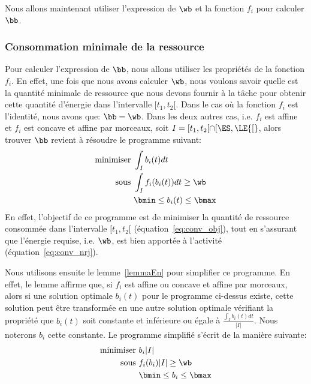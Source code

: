 Nous allons maintenant utiliser l'expression de $\wb$ et la fonction
$f_i$ pour calculer $\bb$.

\subsubsection{Consommation minimale de la ressource}

Pour calculer l'expression de $\bb$, nous allons utiliser les
propriétés de la fonction $f_i$. En effet, une fois que nous avons
calculer $\wb$, nous voulons savoir quelle est la quantité minimale de
ressource que nous devons fournir à la tâche pour obtenir cette
quantité d'énergie dans l'intervalle ${[}t_1,t_2{[}$. Dans le cas où
la fonction $f_i$ est l'identité, nous avons que: $\bb=\wb$. Dans les
deux autres cas, i.e. $f_i$ est affine et $f_i$ est concave et affine
par morceaux, soit $I=[t_1,t_2[ \cap [\ES,\LE{[}$, alors trouver $\bb$
revient à résoudre le programme suivant:
\begin{align}
  \text{minimiser }   & \int_{I} b_i(t)dt \label{eq:conv_obj} \\
  \text{sous } & \int_{I} f_i(b_i(t))dt \ge \wb \label{eq:conv_nrj}\\
                      & \bmin \le b_i(t) \le \bmax \label{eq:conv_min}
\end{align}
En effet, l'objectif de ce programme est de minimiser la quantité de
ressource consommée dans l'intervalle $[t_1,t_2[$
(équation~\eqref{eq:conv_obj}), tout en s'assurant que l'énergie
requise, i.e. $\wb$, est bien apportée à l'activité
(équation~\eqref{eq:conv_nrj}). 

Nous utilisons ensuite le lemme~\ref{lemmaEn} pour simplifier ce
programme. En effet, le lemme affirme que, si $f_i$ est affine ou
concave et affine par morceaux, alors si une solution optimale
$b_i(t)$ pour le programme ci-dessus existe, cette solution peut être
transformée en une autre solution optimale vérifiant la propriété que
$b_i(t)$ soit constante et inférieure ou égale à
$\frac{\int_{I}b_i(t)dt}{|I|}$. Nous noterons $b_i$ cette
constante. Le programme simplifié s'écrit de la manière suivante:
\begin{align}
  \text{minimiser }   & b_i|I| \label{eq:convSimp_obj} \\
  \text{sous } & f_i(b_i)|I| \ge \wb \label{eq:convSimp_nrj}\\
                      &\bmin \le  b_i \le \bmax \label{eq:convSimp_nrj}
\end{align}


